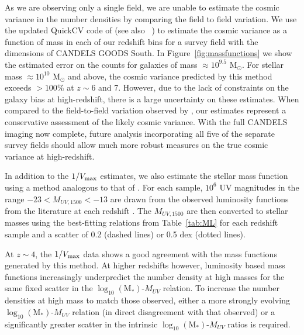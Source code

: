 As we are observing only a single field, we are unable to estimate the cosmic variance in the number densities by comparing the field to field variation. We use the updated QuickCV code of \citet{Moster:2011ip} (see also \citeauthor{Newman:2002fa}~\citeyear{Newman:2002fa}) to estimate the cosmic variance as a function of mass in each of our redshift bins for a survey field with the dimensions of CANDELS GOODS South. In Figure~\ref{fig:massfunctions} we show the estimated error on the counts for galaxies of mass $\approx 10^{9.5}$ M$_{\odot}$. For stellar mass $\approx 10^{10}$ M$_{\odot}$ and above, the cosmic variance predicted by this method exceeds $>100\%$ at $z \sim 6$ and 7. However, due to the lack of constraints on the galaxy bias at high-redshift, there is a large uncertainty on these estimates. When compared to the field-to-field variation observed by \citet{2012ApJ...752...66L}, our estimates represent a conservative assessment of the likely cosmic variance. With the full CANDELS imaging now complete, future analysis incorporating all five of the separate survey fields should allow much more robust measures on the true cosmic variance at high-redshift.

In addition to the $1/V_{\rm{max}}$ estimates, we also estimate the stellar mass function using a method analogous to that of \citet{Gonzalez:2011dn}. For each sample, $10^6$ UV magnitudes in the range $-23 < M_{UV,1500} < -13$ are drawn from the observed luminosity functions from the literature at each redshift \citep{2007ApJ...670..928B,Anonymous:96uKWdy6,McLure:2013hh}. The $M_{UV,1500}$ are then converted to stellar masses using the best-fitting relations from Table~\ref{tab:ML} for each redshift sample and a scatter of 0.2 (dashed lines) or 0.5 dex (dotted lines).

At $z \sim 4$, the $1/V_{\rm{max}}$ data shows a good agreement with the mass functions generated by this method. At higher redshifts however, luminosity based mass functions increasingly underpredict the number density at high masses for the same fixed scatter in the $\log_{10} (\text{M}_{*})$-$M_{UV}$ relation. To increase the number densities at high mass to match those observed, either a more strongly evolving $\log_{10} (\text{M}_{*})$-$M_{UV}$ relation (in direct disagreement with that observed) or a significantly greater scatter in the intrinsic $\log_{10} (\text{M}_{*})$-$M_{UV}$ ratios is required. 

